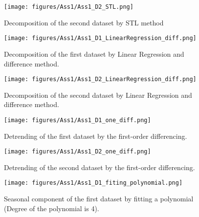 \begin{figure}[H]
    \centering
    \begin{minipage}[b]{1\textwidth}
        \texttt{[image: figures/Ass1/Ass1\_D2\_STL.png]}
    \end{minipage}
    \caption{Decomposition of the second dataset by STL method}
    \label{fig:Ass1_D2_STL}
\end{figure}

\begin{figure}[H]
    \centering
    \begin{minipage}[b]{1\textwidth}
        \texttt{[image: figures/Ass1/Ass1\_D1\_LinearRegression\_diff.png]}
    \end{minipage}
    \caption{Decomposition of the first dataset by Linear Regression and difference method.}
    \label{fig:Ass1_D1_LinearRegression_diff}
\end{figure}

\begin{figure}[H]
    \centering
    \begin{minipage}[b]{1\textwidth}
        \texttt{[image: figures/Ass1/Ass1\_D2\_LinearRegression\_diff.png]}
    \end{minipage}
    \caption{Decomposition of the second dataset by Linear Regression and difference method.}
    \label{fig:Ass1_D2_LinearRegression_diff}
\end{figure}

\begin{figure}[H]
    \centering
    \begin{minipage}[b]{1\textwidth}
        \texttt{[image: figures/Ass1/Ass1\_D1\_one\_diff.png]}
    \end{minipage}
    \caption{Detrending of the first dataset by the first-order differencing.}
    \label{fig:Ass1_D1_one_diff}
\end{figure}

\begin{figure}[H]
    \centering
    \begin{minipage}[b]{1\textwidth}
        \texttt{[image: figures/Ass1/Ass1\_D2\_one\_diff.png]}
    \end{minipage}
    \caption{Detrending of the second dataset by the first-order differencing.}
    \label{fig:Ass1_D2_one_diff}
\end{figure}

\begin{figure}[H]
    \centering
    \begin{minipage}[b]{1\textwidth}
        \texttt{[image: figures/Ass1/Ass1\_D1\_fiting\_polynomial.png]}
    \end{minipage}
    \caption{Seasonal component of the first dataset by fitting a polynomial (Degree of the polynomial is 4).}
    \label{fig:Ass1_D1_fiting_polynomial}
\end{figure}

